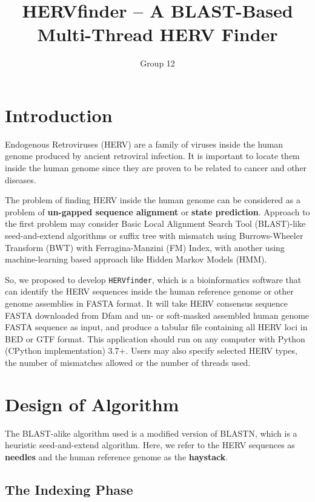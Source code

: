 \documentclass[10pt,final,journal,twocolumn,a4paper]{IEEEtran}
\title{HERVfinder -- A BLAST-Based Multi-Thread HERV Finder}
\author{Group 12}
\begin{document}
\sloppy{}\flushbottom\maketitle\tableofcontents
\section{Introduction}

 Endogenous Retroviruses (HERV) are a family of viruses inside the human genome produced by ancient retroviral infection. It is important to locate them inside the human genome since they are proven to be related to cancer and other diseases.

The problem of finding HERV inside the human genome can be considered as a problem of \textbf{un-gapped sequence alignment} or \textbf{state prediction}. Approach to the first problem may consider Basic Local Alignment Search Tool (BLAST)-like seed-and-extend algorithms or suffix tree with mismatch using Burrows-Wheeler Transform (BWT) with Ferragina-Manzini (FM) Index, with another using machine-learning based approach like Hidden Markov Models (HMM).

So, we proposed to develop \verb|HERVfinder|, which is a bioinformatics software that can identify the HERV sequences inside the human reference genome or other genome assemblies in FASTA format. It will take HERV consensus sequence FASTA downloaded from Dfam and un- or soft-masked assembled human genome FASTA sequence as input, and produce a tabular file containing all HERV loci in BED or GTF format. This application should run on any computer with Python (CPython implementation) 3.7+. Users may also specify selected HERV types, the number of mismatches allowed or the number of threads used.


\section{Design of Algorithm}

The BLAST-alike algorithm used is a modified version of BLASTN, which is a heuristic seed-and-extend algorithm. Here, we refer to the HERV sequences as \textbf{needles} and the human reference genome as the \textbf{haystack}.

\subsection{The \textbf{Indexing} Phase}
\end{document}
